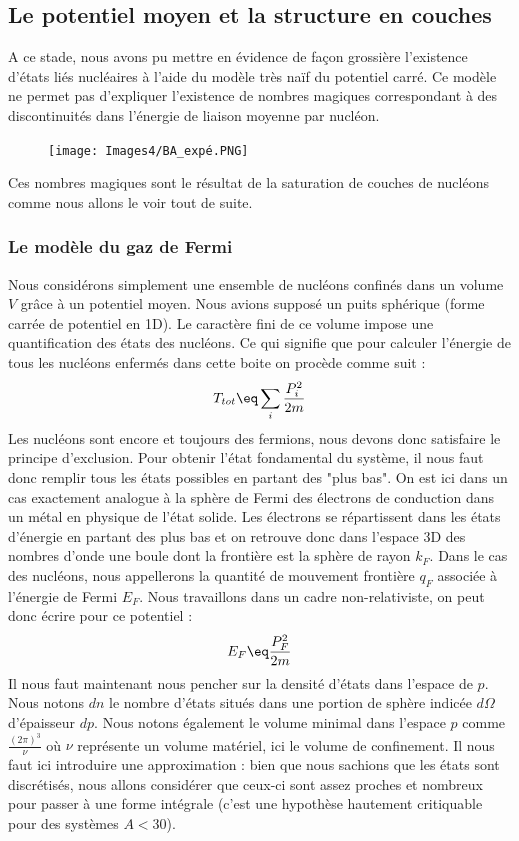 \subsection{Le potentiel moyen et la structure en couches}
A ce stade, nous avons pu mettre en évidence de façon grossière l'existence d'états liés nucléaires à l'aide du modèle très naïf du potentiel carré. Ce modèle ne permet pas d'expliquer l'existence de nombres magiques correspondant à des discontinuités dans l'énergie de liaison moyenne par nucléon.
\begin{figure}[H]
    \centering
    \texttt{[image: Images4/BA\_expé.PNG]}
    \caption{}
\end{figure}
Ces nombres magiques sont le résultat de la saturation de couches de nucléons comme nous allons le voir tout de suite.
\subsubsection{Le modèle du gaz de Fermi}
Nous considérons simplement une ensemble de nucléons confinés dans un volume $V$ grâce à un potentiel moyen. Nous avions supposé un puits sphérique (forme carrée de potentiel en 1D). Le caractère fini de ce volume impose une quantification des états des nucléons. Ce qui signifie que pour calculer l'énergie de tous les nucléons enfermés dans cette boite on procède comme suit :
\begin{equation*}
    T_{tot} \eq \sum_i \frac{P_i^2}{2m}
\end{equation*}
Les nucléons sont encore et toujours des fermions, nous devons donc satisfaire le principe d'exclusion. Pour obtenir l'état fondamental du système, il nous faut donc remplir tous les états possibles en partant des "plus bas". On est ici dans un cas exactement analogue à la sphère de Fermi des électrons de conduction dans un métal en physique de l'état solide. Les électrons se répartissent dans les états d'énergie en partant des plus bas et on retrouve donc dans l'espace 3D des nombres d'onde une boule dont la frontière est la sphère de rayon $k_F$. Dans le cas des nucléons, nous appellerons la quantité de mouvement frontière $q_F$ associée à l'énergie de Fermi $E_F$. Nous travaillons dans un cadre non-relativiste, on peut donc écrire pour ce potentiel :
\begin{equation*}
    E_F \eq \frac{P_F^2}{2m}
\end{equation*}
Il nous faut maintenant nous pencher sur la densité d'états dans l'espace de $p$. Nous notons $dn$ le nombre d'états situés dans une portion de sphère indicée $d\Omega$ d'épaisseur $dp$. Nous notons également le volume minimal dans l'espace $p$ comme $\frac{(2\pi)^3}{\nu}$ où $\nu$ représente un volume matériel, ici le volume de confinement. Il nous faut ici introduire une approximation : bien que nous sachions que les états sont discrétisés, nous allons considérer que ceux-ci sont assez proches et nombreux pour passer à une forme intégrale (c'est une hypothèse hautement critiquable pour des systèmes $A<30$).
